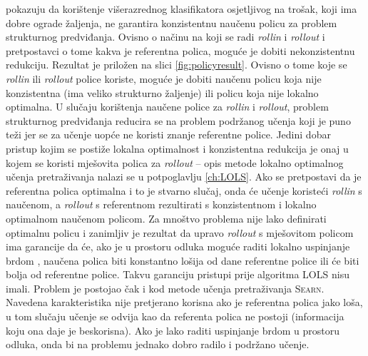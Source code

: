 \cite{daume15lols} pokazuju da korištenje višerazrednog klasifikatora
osjetljivog na trošak, koji ima dobre ograde žaljenja, ne garantira konzistentnu
naučenu policu za problem strukturnog predviđanja. Ovisno o načinu na koji se
radi \textit{rollin} i \textit{rollout} i pretpostavci o tome kakva je
referentna polica, moguće je dobiti nekonzistentnu redukciju. Rezultat je
priložen na slici \ref{fig:policyresult}. Ovisno o tome koje se \textit{rollin}
ili \textit{rollout} police koriste, moguće je dobiti naučenu policu koja nije
konzistentna (ima veliko strukturno žaljenje) ili policu koja nije lokalno
optimalna. U slučaju korištenja naučene police za \textit{rollin} i
\textit{rollout}, problem strukturnog predviđanja reducira se na problem
podržanog učenja koji je puno teži jer se za učenje uopće ne koristi znanje
referentne police. Jedini dobar pristup kojim se postiže lokalna optimalnost i
konzistentna redukcija je onaj u kojem se koristi mješovita polica za
\textit{rollout} -- opis metode lokalno optimalnog učenja pretraživanja nalazi
se u potpoglavlju \ref{ch:LOLS}. Ako se pretpostavi da je referentna polica
optimalna i to je stvarno slučaj, onda će učenje koristeći \textit{rollin} s
naučenom, a \textit{rollout} s referentnom rezultirati s konzistentnom i lokalno
optimalnom naučenom policom. Za mnoštvo problema nije lako definirati optimalnu
policu i zanimljiv je rezultat da upravo \textit{rollout} s mješovitom policom
ima garancije da će, ako je u prostoru odluka moguće raditi lokalno uspinjanje
brdom , naučena polica biti konstantno lošija od dane
referentne police ili će biti bolja od referentne police. Takvu garanciju
pristupi prije algoritma \textsc{LOLS} nisu imali. Problem je postojao čak i kod
metode učenja pretraživanja \textsc{Searn}. Navedena karakteristika nije
pretjerano korisna ako je referentna polica jako loša, u tom slučaju učenje se
odvija kao da referenta polica ne postoji (informacija koju ona daje je
beskorisna). Ako je lako raditi uspinjanje brdom u prostoru odluka, onda bi
na problemu jednako dobro radilo i podržano učenje.

